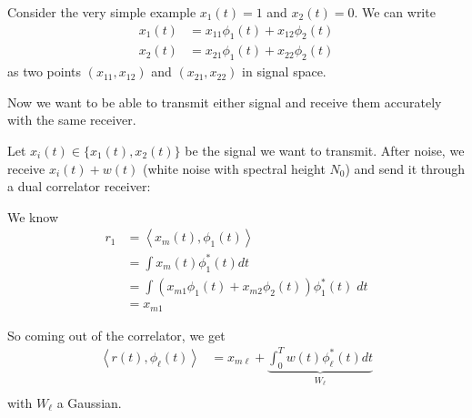 \documentclass[12pt]{report}
\newcommand{\brak}[1]{\left\langle #1 \right\rangle}
\begin{document}
Consider the very simple example $x_1(t) = 1$ and $x_2(t) = 0$. We can write 
\begin{align*}
    x_1(t) &= x_{11} \phi_1(t) + x_{12} \phi_2(t)\\
    x_2(t) &= x_{21} \phi_1(t) + x_{22} \phi_2(t)
\end{align*}
as two points $(x_{11}, x_{12})$ and $(x_{21}, x_{22})$ in signal space.

Now we want to be able to transmit either signal and receive them accurately with the same receiver. 

Let $x_i(t) \in \{x_1(t), x_2(t)\}$ be the signal we want to transmit. After noise, we receive $x_i(t) + w(t)$ (white noise with spectral height $N_0$) and send it through a dual correlator receiver:
\begin{center}
\end{center}

We know 
\begin{align*}
    r_1 &= \brak{x_m(t), \phi_1(t)}\\ 
    &= \int x_m(t) \phi_1^*(t) dt\\
    &= \int \left(x_{m1} \phi_1(t) + x_{m2}\phi_2(t)\right)  \phi_1^*(t) \; dt\\ 
    &= x_{m1}
\end{align*}

So coming out of the correlator, we get 
\begin{align*}
    \brak{r(t), \phi_{\ell}(t)} &= x_{m\ell} + \underbrace{\int_0^T w(t) \phi_{\ell}^*(t) dt}_{W_{\ell}}\\
\end{align*}
with $W_{\ell}$ a Gaussian.
\end{document}

